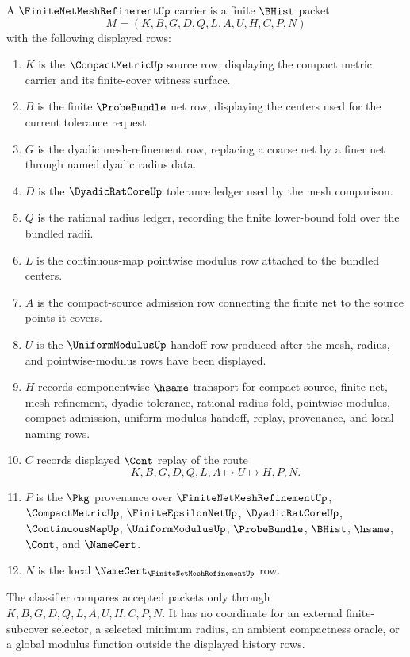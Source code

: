 \begin{definition}
\label{def:finite-net-mesh-refinement-carrier}
A $\FiniteNetMeshRefinementUp$ carrier is a finite $\BHist$ packet
$$
M=(K,B,G,D,Q,L,A,U,H,C,P,N)
$$
with the following displayed rows:
\begin{enumerate}
\item $K$ is the $\CompactMetricUp$ source row, displaying the compact metric carrier and its finite-cover witness surface.
\item $B$ is the finite $\ProbeBundle$ net row, displaying the centers used for the current tolerance request.
\item $G$ is the dyadic mesh-refinement row, replacing a coarse net by a finer net through named dyadic radius data.
\item $D$ is the $\DyadicRatCoreUp$ tolerance ledger used by the mesh comparison.
\item $Q$ is the rational radius ledger, recording the finite lower-bound fold over the bundled radii.
\item $L$ is the continuous-map pointwise modulus row attached to the bundled centers.
\item $A$ is the compact-source admission row connecting the finite net to the source points it covers.
\item $U$ is the $\UniformModulusUp$ handoff row produced after the mesh, radius, and pointwise-modulus rows have been displayed.
\item $H$ records componentwise $\hsame$ transport for compact source, finite net, mesh refinement, dyadic tolerance, rational radius fold, pointwise modulus, compact admission, uniform-modulus handoff, replay, provenance, and local naming rows.
\item $C$ records displayed $\Cont$ replay of the route
$$
K,B,G,D,Q,L,A \longmapsto U \longmapsto H,P,N .
$$
\item $P$ is the $\Pkg$ provenance over $\FiniteNetMeshRefinementUp$, $\CompactMetricUp$, $\FiniteEpsilonNetUp$, $\DyadicRatCoreUp$, $\ContinuousMapUp$, $\UniformModulusUp$, $\ProbeBundle$, $\BHist$, $\hsame$, $\Cont$, and $\NameCert$.
\item $N$ is the local $\NameCert_{\FiniteNetMeshRefinementUp}$ row.
\end{enumerate}
The classifier compares accepted packets only through $K,B,G,D,Q,L,A,U,H,C,P,N$. It has no coordinate for an external finite-subcover selector, a selected minimum radius, an ambient compactness oracle, or a global modulus function outside the displayed history rows.
\end{definition}

